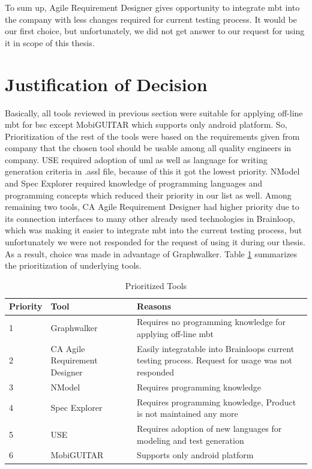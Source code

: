 \par
To sum up, Agile Requirement Designer gives opportunity to integrate \acrshort{mbt} into the company with less changes required for current testing process. It would be our first choice, but unfortunately, we did not get answer to our request for using it in scope of this thesis.

\section{Justification of Decision}

\par
Basically, all tools reviewed in previous section were suitable for applying off-line \acrshort{mbt} for \acrshort{bsc} except MobiGUITAR which supports only android platform. So, Prioritization of the rest of the tools were based on the requirements given from company that the chosen tool should be usable among all quality engineers in company. USE required adoption of \acrshort{uml} as well as language for writing generation criteria in .assl file, because of this it got the lowest priority. NModel and Spec Explorer required knowledge of programming languages and programming concepts which reduced their priority in our list as well. Among remaining two tools, CA Agile Requirement Designer had higher priority due to its connection interfaces to many other already used technologies in Brainloop, which was making it easier to integrate \acrshort{mbt} into the current testing process, but unfortunately we were not responded for the request of using it during our thesis. As a result, choice was made in advantage of Graphwalker. Table \ref{tab:Prioritized_Tools} summarizes the prioritization of underlying tools.

\begin{table}[]
    \centering
    \begin{tabular}{|l|l|p{8cm}|}
        \hline
        Priority & Tool & Reasons \\
        \hline
        1 & Graphwalker & Requires no programming knowledge for applying off-line \acrshort{mbt} \\
        \hline
        2 & CA Agile Requirement Designer & Easily integratable into Brainloops current testing process. Request for usage was not responded \\
        \hline
        3 & NModel & Requires programming knowledge \\
        \hline
        4 & Spec Explorer & Requires programming knowledge, Product is not maintained any more \\
        \hline
        5 & USE & Requires adoption of new languages for modeling and test generation\\
        \hline
        6 & MobiGUITAR & Supports only android platform \\
        \hline
    \end{tabular}
    \caption{Prioritized Tools}
    \label{tab:Prioritized_Tools}
\end{table}